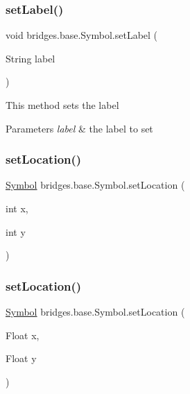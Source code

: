\mbox{\label{classbridges_1_1base_1_1_symbol_af6b944374cbd34334caac28d948a3f21}} 
\subsubsection{\texorpdfstring{set\+Label()}{setLabel()}}
{\footnotesize\ttfamily void bridges.\+base.\+Symbol.\+set\+Label (\begin{DoxyParamCaption}\item[{String}]{label }\end{DoxyParamCaption})}

This method sets the label


\begin{DoxyParams}{Parameters}
{\em label} & the label to set \\
\hline
\end{DoxyParams}
\mbox{\label{classbridges_1_1base_1_1_symbol_ab378b9b3c5ab203fbb4661697f7f7e0a}} 
\subsubsection{\texorpdfstring{set\+Location()}{setLocation()}\hspace{0.1cm}{\footnotesize\ttfamily [1/2]}}
{\footnotesize\ttfamily \mbox{\hyperlink{classbridges_1_1base_1_1_symbol}{Symbol}} bridges.\+base.\+Symbol.\+set\+Location (\begin{DoxyParamCaption}\item[{int}]{x,  }\item[{int}]{y }\end{DoxyParamCaption})}

\mbox{\label{classbridges_1_1base_1_1_symbol_a7d02e54c0cdfcaa7cb26176474207e39}} 
\subsubsection{\texorpdfstring{set\+Location()}{setLocation()}\hspace{0.1cm}{\footnotesize\ttfamily [2/2]}}
{\footnotesize\ttfamily \mbox{\hyperlink{classbridges_1_1base_1_1_symbol}{Symbol}} bridges.\+base.\+Symbol.\+set\+Location (\begin{DoxyParamCaption}\item[{Float}]{x,  }\item[{Float}]{y }\end{DoxyParamCaption})}

